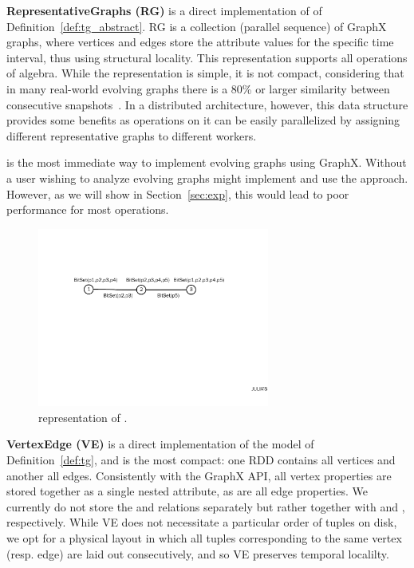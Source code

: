 {\bf RepresentativeGraphs (RG)} is a direct implementation of \trg of
Definition~\ref{def:tg_abstract}.  RG is a collection (parallel
sequence) of GraphX graphs, where vertices and edges store the
attribute values for the specific time interval, thus using structural
locality.  This representation supports all operations of \tg algebra.
%
While the \rg representation is simple, it is not compact, considering
that in many real-world evolving graphs there is a 80\% or larger
similarity between consecutive
snapshots~\cite{DBLP:journals/tos/MiaoHLWYZPCC15}.  In a distributed
architecture, however, this data structure provides some benefits as
operations on it can be easily parallelized by assigning different
representative graphs to different workers.

\rg is the most immediate way to implement evolving graphs using
GraphX. Without \ql a user wishing to analyze evolving graphs might
implement and use the \rg approach.  However, as we will show in
Section~\ref{sec:exp}, this would lead to poor performance for most
operations.

\begin{figure}[t!]
\includegraphics[width=3in]{figs/ogc.pdf}
\caption{\og representation of .}
\label{fig:ogc}
\end{figure}

{\bf VertexEdge (VE)} is a direct implementation of the \tve model of
Definition~\ref{def:tg}, and is the most compact: one RDD contains all
vertices and another all edges.  Consistently with the GraphX API, all
vertex properties are stored together as a single nested attribute, as
are all edge properties.  We currently do not store the \tv and \te
relations separately but rather together with \tav and \tae,
respectively.  While VE does not necessitate a particular order of
tuples on disk, we opt for a physical layout in which all tuples
corresponding to the same vertex (resp. edge) are laid out
consecutively, and so VE preserves temporal localilty.

